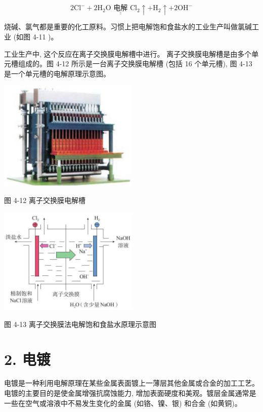 \documentclass[10pt]{article}
\begin{document}
\[
2{\mathrm{{Cl}}}^{ - } + 2{\mathrm{H}}_{2}\mathrm{O}\underline{\underline{\text{ 电解 }}}{\mathrm{{Cl}}}_{2} \uparrow + {\mathrm{H}}_{2} \uparrow + 2{\mathrm{{OH}}}^{ - }
\]

烧碱、氯气都是重要的化工原料。习惯上把电解饱和食盐水的工业生产叫做氯碱工业 (如图 4-11 )。

工业生产中, 这个反应在离子交换膜电解槽中进行。 离子交换膜电解槽是由多个单元槽组成的。图 4-12 所示是一台离子交换膜电解槽 (包括 16 个单元槽), 图 4-13 是一个单元槽的电解原理示意图。

\begin{center}
\includegraphics[max width=0.5\textwidth]{images/0190da9d-8bfd-732f-bc2c-0b21d0f13b91_112_457063.jpg}
\end{center}

图 4-12 离子交换膜电解槽

\begin{center}
\includegraphics[max width=0.5\textwidth]{images/0190da9d-8bfd-732f-bc2c-0b21d0f13b91_112_469926.jpg}
\end{center}

图 4-13 离子交换膜法电解饱和食盐水原理示意图

\section*{2. 电镀}

电镀是一种利用电解原理在某些金属表面镀上一薄层其他金属或合金的加工工艺。电镀的主要目的是使金属增强抗腐蚀能力, 增加表面硬度和美观。镀层金属通常是一些在空气或溶液中不易发生变化的金属 (如铬、镍、银) 和合金 (如黄铜)。
\end{document}
